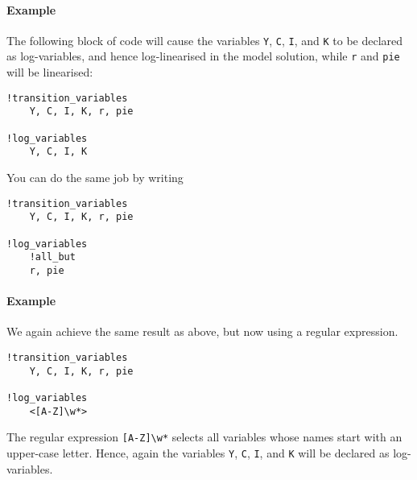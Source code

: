 \paragraph{Example}\label{example}

The following block of code will cause the variables \texttt{Y},
\texttt{C}, \texttt{I}, and \texttt{K} to be declared as log-variables,
and hence log-linearised in the model solution, while \texttt{r} and
\texttt{pie} will be linearised:

\begin{verbatim}
!transition_variables
    Y, C, I, K, r, pie

!log_variables
    Y, C, I, K
\end{verbatim}

You can do the same job by writing

\begin{verbatim}
!transition_variables
    Y, C, I, K, r, pie

!log_variables
    !all_but
    r, pie
\end{verbatim}

\paragraph{Example}\label{example-1}

We again achieve the same result as above, but now using a regular
expression.

\begin{verbatim}
!transition_variables
    Y, C, I, K, r, pie

!log_variables
    <[A-Z]\w*>
\end{verbatim}

The regular expression \texttt{{[}A-Z{]}\textbackslash{}w*} selects all
variables whose names start with an upper-case letter. Hence, again the
variables \texttt{Y}, \texttt{C}, \texttt{I}, and \texttt{K} will be
declared as log-variables.


